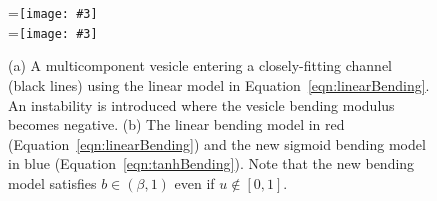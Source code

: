 \documentclass[twoside,twocolumn,9pt]{article}
\newcommand{\subfigimg}[3][,]{%
  \setbox1=\hbox{\texttt{[image: \#3]}}%
  \leavevmode\rlap{\usebox1}%
  \rlap{\hspace*{0pt}\raisebox{\dimexpr\ht1-0\baselineskip}{\bf
  \normalsize #2}}%
  \phantom{\usebox1}%
}
\begin{document}
\begin{figure}[h]
  \centering
  \subfigimg[width=0.9\linewidth, clip ]{(a)}{figures/OldBending.pdf} \\
  \subfigimg[width=0.9\linewidth, clip ]{(b)}{figures/concModels.pdf}
  \caption{\label{fig:concModels} \small (a) A multicomponent vesicle
  entering a closely-fitting channel (black lines) using the linear
  model in Equation~\eqref{eqn:linearBending}. An instability is
  introduced where the vesicle bending modulus becomes negative. (b) The
  linear bending model in red (Equation~\eqref{eqn:linearBending}) and
  the new sigmoid bending model in blue
  (Equation~\eqref{eqn:tanhBending}). Note that the new bending model
  satisfies $b \in (\beta,1)$ even if $u \notin [0,1]$.}
\end{figure}





\end{document}
